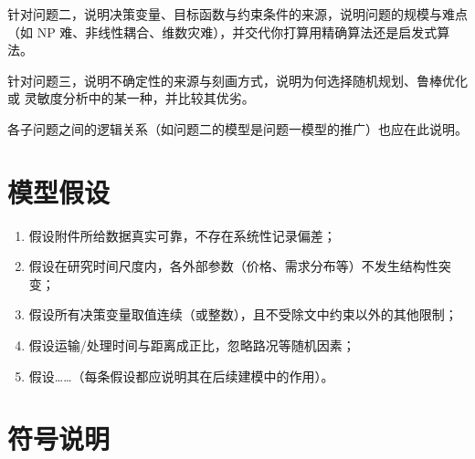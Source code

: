 \documentclass[12pt,a4paper]{ctexart}
\begin{document}
针对问题二，说明决策变量、目标函数与约束条件的来源，说明问题的规模与难点
（如 NP 难、非线性耦合、维数灾难），并交代你打算用精确算法还是启发式算法。

针对问题三，说明不确定性的来源与刻画方式，说明为何选择随机规划、鲁棒优化或
灵敏度分析中的某一种，并比较其优劣。

各子问题之间的逻辑关系（如问题二的模型是问题一模型的推广）也应在此说明。

\section{模型假设}
\label{sec:assumptions}

\begin{enumerate}
  \item 假设附件所给数据真实可靠，不存在系统性记录偏差；
  \item 假设在研究时间尺度内，各外部参数（价格、需求分布等）不发生结构性突变；
  \item 假设所有决策变量取值连续（或整数），且不受除文中约束以外的其他限制；
  \item 假设运输/处理时间与距离成正比，忽略路况等随机因素；
  \item 假设……（每条假设都应说明其在后续建模中的作用）。
\end{enumerate}

\section{符号说明}
\label{sec:notation}
\end{document}
